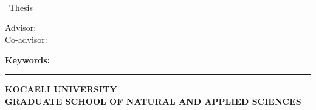 \newpage
\chapter*{\eabstract}

\begin{center}
{\bfseries \Large\titleEN}

\student

\departmentEN \\ {\degree~Thesis}

Advisor: \advisorEN \\
Co-advisor: \coadvisorEN

\end{center}

\abstractTextEnglish

{\bfseries Keywords:} \abstractKeywordsEnglish

\vfill


\begin{center}
\rule{0.8\textwidth}{.1pt}
    
\bfseries \small
 KOCAELI UNIVERSITY\\
 GRADUATE SCHOOL OF NATURAL AND APPLIED SCIENCES
\end{center}

\fi
\fi


\onehalfspacing
\clearpage
{}